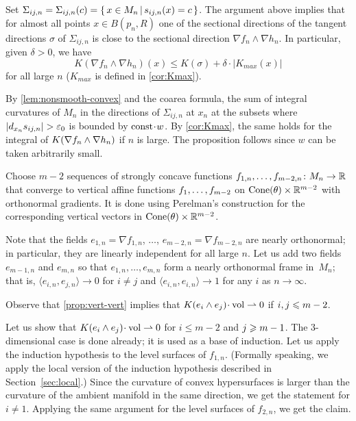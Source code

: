 Set $\Sigma_{ij,n}=\Sigma_{ij,n}(c)=\left\{\,x\in M_n\,\middle|\,s_{ij,n}(x)=c\,\right\}$.
The argument above implies that for almost all points $x\in B(p_n,R)$ one of the sectional directions of the tangent directions $\sigma$ of $\Sigma_{ij,n}$ is close to the sectional direction $\nabla f_n\wedge\nabla h_n$.
In particular, given $\delta>0$, we have 
\[K(\nabla f_n\wedge\nabla h_n)(x)\le K(\sigma)+\delta\cdot|K_{max}(x)|\]
for all large $n$ ($K_{max}$ is defined in \ref{cor:Kmax}).

By \ref{lem:nonsmooth-convex} and the coarea formula, the sum of integral curvatures of $M_n$ in the directions of $\Sigma_{ij,n}$ at $x_n$ at the subsets where $|d_{x_n}s_{ij,n}|>\eps_0$ is bounded by $\const\cdot w$.
By \ref{cor:Kmax}, the same holds for the integral of $K(\nabla f_n\zz\wedge\nabla h_n)$ if $n$ is large.
The proposition follows since $w$ can be taken arbitrarily small.
\qeds


Choose $m-2$ sequences of strongly concave functions $f_{1,n},\zz\dots, f_{m-2,n}\: M_n\to \RR$ that converge to vertical affine functions $f_1,\zz\dots,f_{m-2}$ on  $\operatorname{Cone}(\theta)\times \mathbb{R}^{m-2}$ with orthonormal gradients.
It is done using Perelman's construction \cite[7.1.1 and 7.2.3]{petrunin-conc} for the corresponding vertical vectors in $\operatorname{Cone}(\theta)\times \mathbb{R}^{m-2}$.

Note that the fields $e_{1,n}=\nabla f_{1,n}$, $\dots$, $e_{m-2,n}=\nabla f_{m-2,n}$ are nearly orthonormal;
in particular, they are linearly independent for all large $n$.
Let us add two fields $e_{m-1,n}$ and $e_{m,n}$  so that $e_{1,n},\dots, e_{m,n}$ form a nearly orthonormal frame in~$M_n$;
that is, $\langle e_{i,n}, e_{j,n}\rangle\to 0$ for $i\ne j$ and $\langle e_{i,n}, e_{i,n}\rangle\to 1$ for any $i$ as $n\to\infty$.

Observe that \ref{prop:vert-vert} implies that $K(e_i\wedge e_j)\cdot\vol\rightharpoonup 0$ if $i,j\zz\le m-2$.

Let us show that $K(e_i\wedge e_j)\cdot\vol\rightharpoonup 0$ for $i\le m-2$ and $j\zz\ge m\zz-1$.
The $3$-dimensional case is done already; it is used as a base of induction.
Let us apply the induction hypothesis to the level surfaces of $f_{1,n}$.
(Formally speaking, we apply the local version of the induction hypothesis described in Section~\ref{sec:local}.)
Since the curvature of convex hypersurfaces is larger than the curvature of the ambient manifold in the same direction, we get the statement for $i\ne 1$.
Applying the same argument for the level surfaces of $f_{2,n}$, we get the claim.

